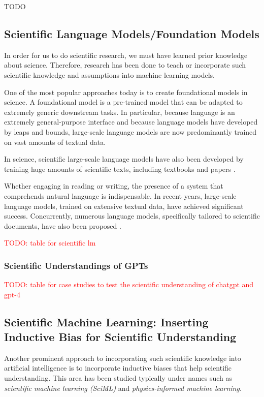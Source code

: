 TODO

\subsection{Scientific Language Models/Foundation Models}
In order for us to do scientific research, we must have learned prior knowledge about science. Therefore, research has been done to teach or incorporate such scientific knowledge and assumptions into machine learning models.

One of the most popular approaches today is to create foundational models in science. A foundational model is a pre-trained model that can be adapted to extremely generic downstream tasks. In particular, because language is an extremely general-purpose interface and because language models have developed by leaps and bounds, large-scale language models are now predominantly trained on vast amounts of textual data.

In science, scientific large-scale language models have also been developed by training huge amounts of scientific texts, including textbooks and papers \cite{taylor2022galactica}.


Whether engaging in reading or writing, the presence of a system that comprehends natural language is indispensable. In recent years, large-scale language models, trained on extensive textual data, have achieved significant success. Concurrently, numerous language models, specifically tailored to scientific documents, have also been proposed \cite{beltagy2019scibert,singh2022scirepeval,nadkarni2021scientific,cohan2020specter,gupta2022matscibert,taylor2022galactica}.

\textcolor{red}{TODO: table for scientific lm}

\subsubsection{Scientific Understandings of GPTs}

\textcolor{red}{TODO: table for case studies to test the scientific understanding of chatgpt and gpt-4 }

\subsection{Scientific Machine Learning: Inserting Inductive Bias for Scientific Understanding}
Another prominent approach to incorporating such scientific knowledge into artificial intelligence is to incorporate inductive biases that help scientific understanding. This area has been studied typically under names such as \textit{scientific machine learning (SciML)} and \textit{physics-informed machine learning}.

